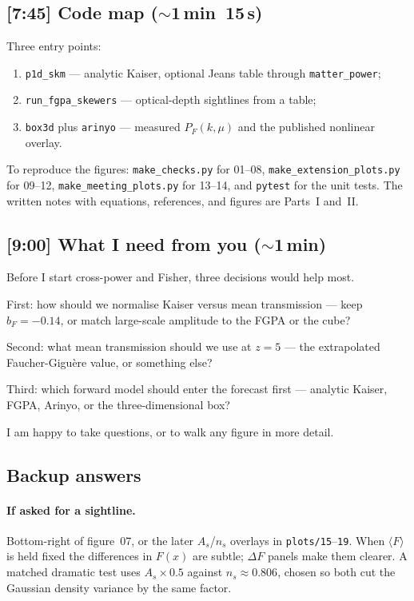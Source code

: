 \documentclass[11pt]{article}
\begin{document}
\subsection*{[7:45] Code map ($\sim$1\,min~15\,s)}

Three entry points:
\begin{enumerate}
\item \texttt{p1d\_skm} --- analytic Kaiser, optional Jeans table through \texttt{matter\_power};
\item \texttt{run\_fgpa\_skewers} --- optical-depth sightlines from a table;
\item \texttt{box3d} plus \texttt{arinyo} --- measured $P_F(k,\mu)$ and the published nonlinear overlay.
\end{enumerate}

To reproduce the figures:
\texttt{make\_checks.py} for 01--08,
\texttt{make\_extension\_plots.py} for 09--12,
\texttt{make\_meeting\_plots.py} for 13--14,
and \texttt{pytest} for the unit tests.
The written notes with equations, references, and figures are Parts~I and~II.

\subsection*{[9:00] What I need from you ($\sim$1\,min)}

Before I start cross-power and Fisher, three decisions would help most.

First: how should we normalise Kaiser versus mean transmission --- keep $b_F=-0.14$, or match large-scale amplitude to the FGPA or the cube?

Second: what mean transmission should we use at $z=5$ --- the extrapolated Faucher-Gigu\`ere value, or something else?

Third: which forward model should enter the forecast first --- analytic Kaiser, FGPA, Arinyo, or the three-dimensional box?

I am happy to take questions, or to walk any figure in more detail.

\subsection*{Backup answers}

\paragraph{If asked for a sightline.}
Bottom-right of figure~07, or the later $A_s$/$n_s$ overlays in \texttt{plots/15}--\texttt{19}.
When $\langle F\rangle$ is held fixed the differences in $F(x)$ are subtle; $\Delta F$ panels make them clearer.
A matched dramatic test uses $A_s\times 0.5$ against $n_s\approx 0.806$, chosen so both cut the Gaussian density variance by the same factor.
\end{document}
